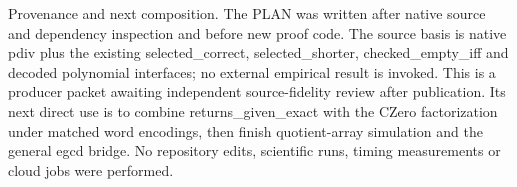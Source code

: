 \documentclass[10pt]{article}
\begin{document}
Provenance and next composition. The PLAN was written after native source and dependency inspection and before new proof code. The source basis is native pdiv plus the existing selected\_correct, selected\_shorter, checked\_empty\_iff and decoded polynomial interfaces; no external empirical result is invoked. This is a producer packet awaiting independent source-fidelity review after publication. Its next direct use is to combine returns\_given\_exact with the CZero factorization under matched word encodings, then finish quotient-array simulation and the general egcd bridge. No repository edits, scientific runs, timing measurements or cloud jobs were performed.\par\medskip
\end{document}
